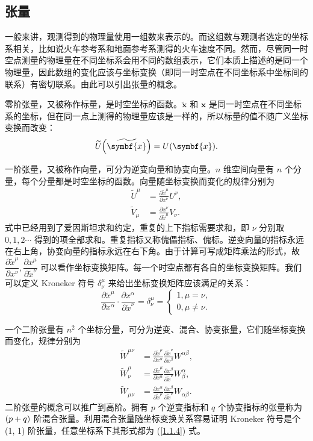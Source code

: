 \documentclass[UTF8, 12pt, a4paper, oneside, onecolumn, fontset=none]{ctexart}
\begin{document}
\subsection{张量}
一般来讲，观测得到的物理量使用一组数来表示的。而这组数与观测者选定的坐标系相关，比如说火车参考系和地面参考系测得的火车速度不同。然而，尽管同一时空点测量的物理量在不同坐标系会用不同的数组表示，它们本质上描述的是同一个物理量，因此数组的变化应该与坐标变换（即同一时空点在不同坐标系中坐标间的联系）有密切联系。由此可以引出张量的概念。

零阶张量，又被称作标量，是时空坐标的函数。$\widetilde{\symbf{x}}$ 和 $\symbf{x}$ 是同一时空点在不同坐标系的坐标，但在同一点上测得的物理量应该是一样的，所以标量的值不随广义坐标变换而改变：
\begin{equation}
\widetilde{U}\mleft(\widetilde{\symbf{x}}\mright)=U\mleft(\symbf{x}\mright).
\end{equation}

一阶张量，又被称作向量，可分为逆变向量和协变向量。$n$ 维空间向量有 $n$ 个分量，每个分量都是时空坐标的函数。向量随坐标变换而变化的规律分别为
\begin{align}
\widetilde{U}^{\mu}&=\frac{\partial\widetilde{x}^{\mu}}{\partial{}x^{\nu}}U^{\nu},\\
\widetilde{V}_{\mu}&=\frac{\partial{}{x}^{\nu}}{\partial\widetilde{x}^{\mu}}V_{\nu}.
\end{align}
式中已经用到了爱因斯坦求和约定，重复的上下指标需要求和，即 $\nu$ 分别取 $0, 1, 2\cdots$ 得到的项全部求和。重复指标又称傀儡指标、傀标。逆变向量的指标永远在右上角，协变向量的指标永远在右下角。由于计算可写成矩阵乘法的形式，故 $\dfrac{\partial\widetilde{x}^{\mu}}{\partial{}x^{\nu}},\dfrac{\partial{}x^{\mu}}{\partial\widetilde{x}^{\nu}}$ 可以看作坐标变换矩阵。每一个时空点都有各自的坐标变换矩阵。我们可以定义 Kroneker 符号 $\delta^{\mu}_{\nu}$ 来给出坐标变换矩阵应该满足的关系：
\begin{equation}
\frac{\partial\widetilde{x}^{\mu}}{\partial{}x^{\alpha}}\cdot\frac{\partial{}x^{\alpha}}{\partial\widetilde{x}^{\nu}}=\delta_{\nu}^{\mu}=
\begin{cases}
1,\mu=\nu,\\
0,\mu\ne\nu.
\end{cases}\label{1.1.4}
\end{equation}

一个二阶张量有 $n^{2}$ 个坐标分量，可分为逆变、混合、协变张量，它们随坐标变换而变化，规律分别为
\begin{align}
\widetilde{W}^{\mu\nu}&=\frac{\partial\widetilde{x}^{\mu}}{\partial{}x^{\alpha}}\frac{\partial\widetilde{x}^{\nu}}{\partial{}x^{\beta}}W^{\alpha\beta},\\
\widetilde{W}^{\mu}_{\nu}&=\frac{\partial\widetilde{x}^{\mu}}{\partial{}x^{\alpha}}\frac{\partial{}{x}^{\beta}}{\partial\widetilde{x}^{\nu}}W^{\alpha}_{\beta},\\
\widetilde{W}_{\mu\nu}&=\frac{\partial{}{x}^{\alpha}}{\partial\widetilde{x}^{\mu}}\frac{\partial{}{x}^{\beta}}{\partial\widetilde{x}^{\nu}}W_{\alpha\beta}.
\end{align}
二阶张量的概念可以推广到高阶。拥有 $p$ 个逆变指标和 $q$ 个协变指标的张量称为 $\mleft(p+q\mright)$ 阶混合张量。利用混合张量随坐标变换关系容易证明 Kroneker 符号是个 (1, 1) 阶张量，任意坐标系下其形式都为 (\ref{1.1.4}) 式。
\end{document}
